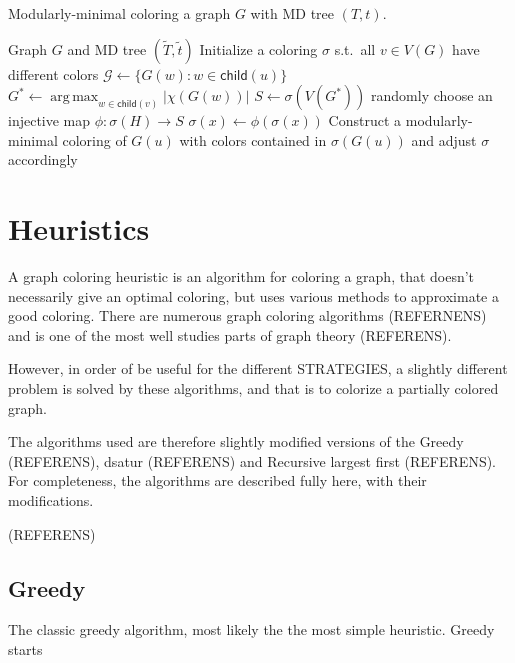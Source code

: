 \documentclass{amsart}
\newcommand{\child}{\mathsf{child}}
\DeclareMathOperator*{\argmax}{arg\,max}
\newcommand{\T}{\widetilde{T}}
\renewcommand{\t}{\widetilde{t}}
\begin{document}
\begin{algorithm}[t]
  \caption{Modularly-minimal coloring a graph $G$ with MD tree $(T,t)$.}
  \label{alg:modmin}
  \begin{algorithmic}[1]
    \REQUIRE Graph $G$ and MD tree $(\T,\t)$
    \STATE Initialize a coloring $\sigma$ s.t.\ all $v \in V(G)$
           have different colors
          \STATE $\mathcal{G} \leftarrow \{G(w)\colon w\in\child(u)\}$ 
          \STATE $G^* \leftarrow \argmax_{w\in\child(v)} |\chi(G(w))|$
          \STATE $S \leftarrow \sigma(V(G^*))$ 
             \STATE randomly choose an injective map $\phi:\sigma(H)\to S$
                \STATE $\sigma(x)\leftarrow \phi(\sigma(x))$  
             \ENDFOR
          \ENDFOR
          \STATE Construct a modularly-minimal coloring of $G(u)$
              with colors contained in $\sigma(G(u))$
              and adjust $\sigma$ accordingly \label{alg:prime-color}
       \ENDIF
    \ENDFOR
  \end{algorithmic}
\end{algorithm}



\section{Heuristics}
\label{sec:Heuristics}

A graph coloring heuristic is an algorithm for coloring a graph, that doesn't
necessarily give an optimal coloring, but uses various methods to approximate a
good coloring. There are numerous graph coloring algorithms (REFERNENS) and is
one of the most well studies parts of graph theory (REFERENS). 

However, in order of be useful for the different STRATEGIES, a slightly
different problem is solved by these algorithms, and that is to colorize a
partially colored graph.

The algorithms used are therefore slightly modified versions of the 
Greedy (REFERENS), dsatur (REFERENS) and Recursive largest first (REFERENS). For
completeness, the algorithms are described fully here, with their modifications.



(REFERENS)
\subsection{Greedy}
\label{alg:greedy}
The classic greedy algorithm, most likely the the most simple heuristic. Greedy
starts 
\end{document}
